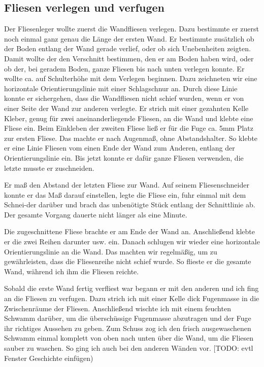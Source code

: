 \subsection{Fliesen verlegen und verfugen}

Der Fliesenleger wollte zuerst die Wandfliesen verlegen. Dazu bestimmte er zuerst noch einmal ganz genau die Länge der ersten Wand. Er bestimmte zusätzlich ob der Boden entlang der Wand gerade verlief, oder ob sich Unebenheiten zeigten. Damit wollte der den Verschnitt bestimmen, den er am Boden haben wird, oder ob der, bei geradem Boden, ganze Fliesen bis nach unten verlegen konnte. Er wollte ca. auf Schulterhöhe mit dem Verlegen beginnen. Dazu zeichneten wir eine horizontale Orientierungslinie mit einer Schlagschnur an. Durch diese Linie konnte er sichergehen, dass die Wandfliesen nicht schief wurden, wenn er von einer Seite der Wand zur anderen verlegte. Er strich mit einer gezahnten Kelle Kleber, genug für zwei aneinanderliegende Fliesen, an die Wand und klebte eine Fliese ein. Beim Einkleben der zweiten Fliese ließ er für die Fuge ca. 5mm Platz zur ersten Fliese. Das machte er nach Augenmaß, ohne Abstandshalter. So klebte er eine Linie Fliesen vom einen Ende der Wand zum Anderen, entlang der Orientierungslinie ein. Bis jetzt konnte er dafür ganze Fliesen verwenden, die letzte musste er zuschneiden.

Er maß den Abstand der letzten Fliese zur Wand. Auf seinem Fliesenschneider konnte er das Maß darauf einstellen, legte die Fliese ein, fuhr einmal mit dem Schnei-der darüber und brach das unbenötigte Stück entlang der Schnittlinie ab. Der gesamte Vorgang dauerte nicht länger als eine Minute.

Die zugeschnittene Fliese brachte er am Ende der Wand an. Anschließend klebte er die zwei Reihen darunter usw. ein. Danach schlugen wir wieder eine horizontale Orientierungslinie an die Wand. Das machten wir regelmäßig, um zu gewährleisten, dass die Fliesenreihe nicht schief wurde. So flieste er die gesamte Wand, während ich ihm die Fliesen reichte.

Sobald die erste Wand fertig verfliest war begann er mit den anderen und ich fing an die Fliesen zu verfugen. Dazu strich ich mit einer Kelle dick Fugenmasse in die Zwischenräume der Fliesen. Anschließend wischte ich mit einem feuchten Schwamm darüber, um die überschüssige Fugenmasse abzutragen und der Fuge ihr richtiges Aussehen zu geben. Zum Schuss zog ich den frisch ausgewaschenen Schwamm einmal komplett von oben nach unten über die Wand, um die Fliesen sauber zu waschen. So ging ich auch bei den anderen Wänden vor. [TODO: evtl Fenster Geschichte einfügen)

